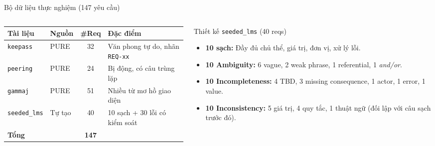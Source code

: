 \documentclass[aspectratio=169,10pt]{beamer}
\begin{document}
\begin{frame}{Bộ dữ liệu thực nghiệm (147 yêu cầu)}
  \begin{columns}[T]
    \begin{column}{0.55\textwidth}
      \small
      \begin{tabular}{llcp{2.3cm}}
        \toprule
        \textbf{Tài liệu} & \textbf{Nguồn} & \textbf{\#Req} & \textbf{Đặc điểm} \\
        \midrule
        \texttt{keepass} & PURE & 32 & Văn phong tự do, nhãn \texttt{REQ-xx} \\
        \texttt{peering} & PURE & 24 & Bị động, có câu trùng lặp \\
        \texttt{gammaj} & PURE & 51 & Nhiều từ mơ hồ giao diện \\
        \texttt{seeded\_lms} & Tự tạo & 40 & 10 sạch + 30 lỗi có kiểm soát \\
        \midrule
        \textbf{Tổng} & & \textbf{147} & \\
        \bottomrule
      \end{tabular}
    \end{column}
    \begin{column}{0.42\textwidth}
      \begin{block}{Thiết kế \texttt{seeded\_lms} (40 reqs)}
        \begin{itemize}
          \item \textbf{10 sạch:} Đầy đủ chủ thể, giá trị, đơn vị, xử lý lỗi.
          \item \textbf{10 Ambiguity:} 6 vague, 2 weak phrase, 1 referential, 1 \textit{and/or}.
          \item \textbf{10 Incompleteness:} 4 TBD, 3 missing consequence, 1 actor, 1 error, 1 value.
          \item \textbf{10 Inconsistency:} 5 giá trị, 4 quy tắc, 1 thuật ngữ (đối lập với câu sạch trước đó).
        \end{itemize}
      \end{block}
    \end{column}
  \end{columns}
\end{frame}
\end{document}
